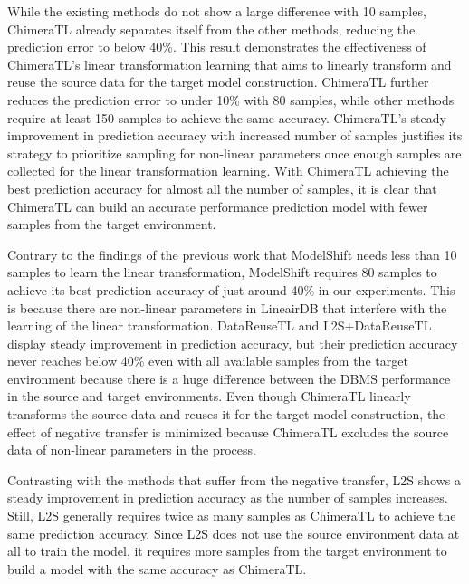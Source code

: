 While the existing methods do not show a large difference with 10 samples, ChimeraTL already separates itself from the other methods, reducing the prediction error to below 40\%.
This result demonstrates the effectiveness of ChimeraTL's linear transformation learning that aims to linearly transform and reuse the source data for the target model construction.
ChimeraTL further reduces the prediction error to under 10\% with 80 samples, while other methods require at least 150 samples to achieve the same accuracy.
ChimeraTL's steady improvement in prediction accuracy with increased number of samples justifies its strategy to prioritize sampling for non-linear parameters once enough samples are collected for the linear transformation learning.
With ChimeraTL achieving the best prediction accuracy for almost all the number of samples, it is clear that ChimeraTL can build an accurate performance prediction model with fewer samples from the target environment. 

Contrary to the findings of the previous work that ModelShift needs less than 10 samples to learn the linear transformation\cite{Valov}, ModelShift requires 80 samples to achieve its best prediction accuracy of just around 40\% in our experiments.
This is because there are non-linear parameters in LineairDB that interfere with the learning of the linear transformation.
DataReuseTL and L2S+DataReuseTL display steady improvement in prediction accuracy, but their prediction accuracy never reaches below 40\% even with all available samples from the target environment because there is a huge difference between the DBMS performance in the source and target environments.
Even though ChimeraTL linearly transforms the source data and reuses it for the target model construction, the effect of negative transfer is minimized because ChimeraTL excludes the source data of non-linear parameters in the process.

Contrasting with the methods that suffer from the negative transfer, L2S shows a steady improvement in prediction accuracy as the number of samples increases.
Still, L2S generally requires twice as many samples as ChimeraTL to achieve the same prediction accuracy.
Since L2S does not use the source environment data at all to train the model, it requires more samples from the target environment to build a model with the same accuracy as ChimeraTL.

